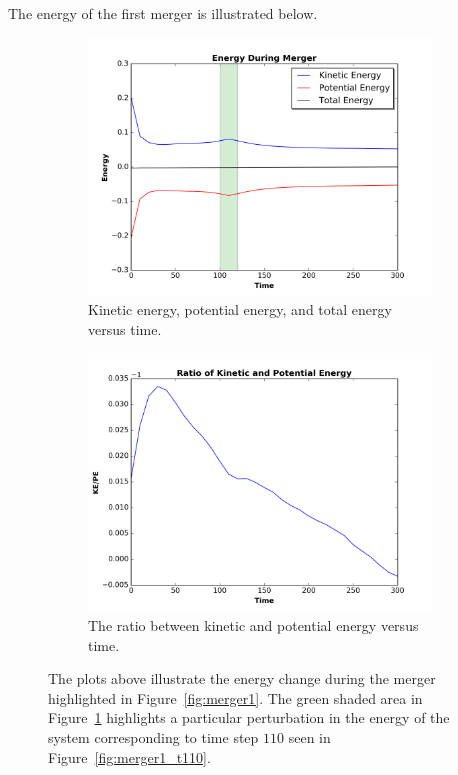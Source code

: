\documentclass[12pt]{report}
\begin{document}
The energy of the first merger is illustrated below.

\begin{figure}[H]
\centering 
    \begin{subfigure}[b]{.475\textwidth}
        \centering
        \includegraphics[width=\linewidth]{Energy_of_merger-model1.png}
        \caption[]%
        {{Kinetic energy, potential energy, and total energy versus time.}}
        
        \label{fig:totalenergy}
    \end{subfigure} %
    \hfill
    \begin{subfigure}[b]{.475\textwidth}
        \centering
        \includegraphics[width=\linewidth]{ratioofkineticandpotential_mod1.png}
        \caption[]%
        {{The ratio between kinetic and potential energy versus time.}}
        \label{fig:ratiomerger1}
    \end{subfigure} %
    \caption[]
        {The plots above illustrate the energy change during the merger highlighted in Figure~\ref{fig:merger1}. The green shaded area in Figure~\ref{fig:totalenergy} highlights a particular perturbation in the energy of the system corresponding to time step $110$ seen in Figure~\ref{fig:merger1_t110}.} 
        \label{fig:energyofmerger1}
\end{figure}
\end{document}
